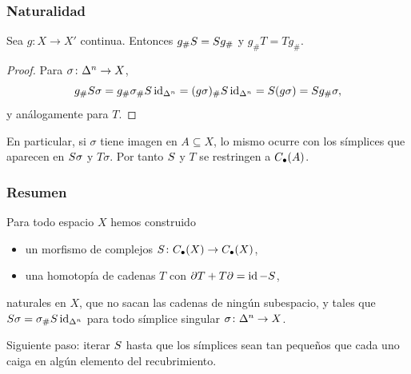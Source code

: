 \begin{frame}
  \frametitle{Naturalidad}

  \begin{proposition}
    Sea $g\colon X\to X'$ continua. Entonces $g_\#S=S g_\#$ y
    $g_\#T=Tg_\#$.
  \end{proposition}

  \begin{proof}
    Para $\sigma\colon\Delta^{n}\to X$,
    \[
      g_\#S\sigma=g_\#\sigma_\#S\operatorname{id}_{\Delta^{n}}=(g\sigma)_\#S\operatorname{id}_{\Delta^{n}}=S(g\sigma)
      =S g_\#\sigma,
    \]
    y análogamente para $T$.
  \end{proof}

  \medskip

  En particular, si $\sigma$ tiene imagen en $A\subseteq X$, lo mismo ocurre con
  los símplices que aparecen en $S\sigma$ y $T\sigma$. Por tanto $S$ y $T$
  se restringen a $C_\bullet(A)$.
\end{frame}

\begin{frame}
  \frametitle{Resumen}

  Para todo espacio $X$ hemos construido
  \begin{itemize}
    \item un morfismo de complejos $S\colon C_\bullet(X)\to C_\bullet(X)$,
    \item una homotopía de cadenas $T$ con $\partial T+T\partial=\operatorname{id}-S$,
  \end{itemize}
  naturales en $X$, que no sacan las cadenas de ningún subespacio, y tales que
  $S\sigma=\sigma_\#S\operatorname{id}_{\Delta^{n}}$ para todo símplice singular
  $\sigma\colon\Delta^{n}\to X$.

  \medskip

  Siguiente paso: iterar $S$ hasta que los símplices sean tan pequeños que
  cada uno caiga en algún elemento del recubrimiento.
\end{frame}
